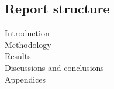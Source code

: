 
%
%
%


\subsection{Report structure}


  Introduction \\
  Methodology \\
  Results \\
  Discussions and conclusions \\
  Appendices \\
